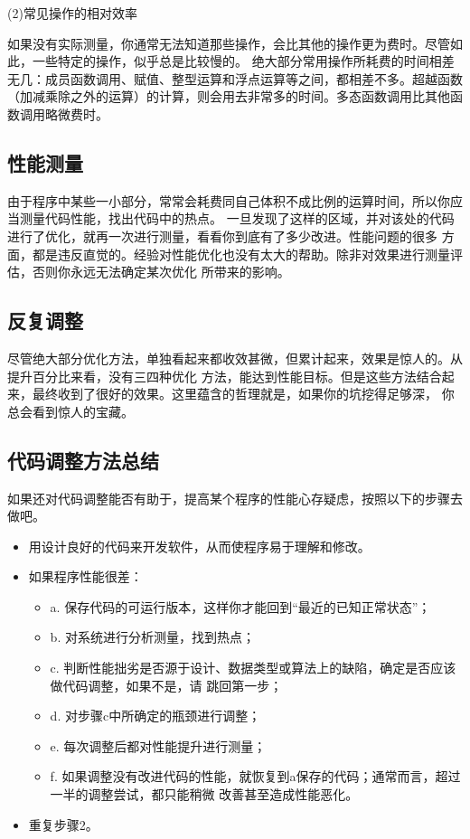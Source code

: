\documentclass{article}
\begin{document}
\par
(2)常见操作的相对效率
\par
如果没有实际测量，你通常无法知道那些操作，会比其他的操作更为费时。尽管如此，一些特定的操作，似乎总是比较慢的。
绝大部分常用操作所耗费的时间相差无几：成员函数调用、赋值、整型运算和浮点运算等之间，都相差不多。超越函数
（加减乘除之外的运算）的计算，则会用去非常多的时间。多态函数调用比其他函数调用略微费时。

\subsection{性能测量}
由于程序中某些一小部分，常常会耗费同自己体积不成比例的运算时间，所以你应当测量代码性能，找出代码中的热点。
一旦发现了这样的区域，并对该处的代码进行了优化，就再一次进行测量，看看你到底有了多少改进。性能问题的很多
方面，都是违反直觉的。经验对性能优化也没有太大的帮助。除非对效果进行测量评估，否则你永远无法确定某次优化
所带来的影响。

\subsection{反复调整}
尽管绝大部分优化方法，单独看起来都收效甚微，但累计起来，效果是惊人的。从提升百分比来看，没有三四种优化
方法，能达到性能目标。但是这些方法结合起来，最终收到了很好的效果。这里蕴含的哲理就是，如果你的坑挖得足够深，
你总会看到惊人的宝藏。

\subsection{代码调整方法总结}
如果还对代码调整能否有助于，提高某个程序的性能心存疑虑，按照以下的步骤去做吧。
\begin{itemize}
    \item 用设计良好的代码来开发软件，从而使程序易于理解和修改。
    \item 如果程序性能很差：
    \begin{itemize}
        \item a. 保存代码的可运行版本，这样你才能回到“最近的已知正常状态”；
        \item b. 对系统进行分析测量，找到热点；
        \item c. 判断性能拙劣是否源于设计、数据类型或算法上的缺陷，确定是否应该做代码调整，如果不是，请
        跳回第一步；
        \item d. 对步骤c中所确定的瓶颈进行调整；
        \item e. 每次调整后都对性能提升进行测量；
        \item f. 如果调整没有改进代码的性能，就恢复到a保存的代码；通常而言，超过一半的调整尝试，都只能稍微
        改善甚至造成性能恶化。
    \end{itemize}
    \item 重复步骤2。
\end{itemize}
\end{document}
